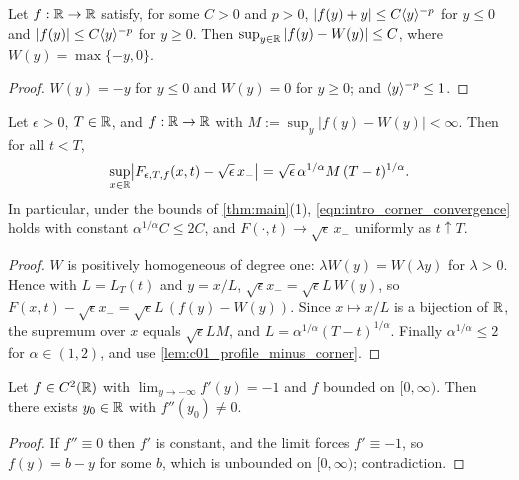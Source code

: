 \begin{lemma}
  \label{lem:c01_profile_minus_corner}
  Let $f:\mathbb{R}\to\mathbb{R}$ satisfy, for some $C>0$ and $p>0$, $|f(y)+y|\le C\langle y \rangle^{-p}$ for $y\le0$ and
  $|f(y)|\le C\langle y \rangle^{-p}$ for $y\ge0$.  Then $\sup_{y\in\mathbb{R}}|f(y)-W(y)|\le C$, where
  $W(y)=\max\{-y,0\}$.
\end{lemma}
\begin{proof}
  $W(y)=-y$ for $y\le0$ and $W(y)=0$ for $y\ge0$; and $\langle y \rangle^{-p}\le1$.
\end{proof}

\begin{lemma}
  \label{lem:c01_corner_convergence}
  Let $\epsilon>0$, $T\in\mathbb{R}$, and $f:\mathbb{R}\to\mathbb{R}$ with $M:=\sup_y|f(y)-W(y)|<\infty$.  Then for all
  $t<T$,
  \[
    \sup_{x\in\mathbb{R}}\bigl|F_{\epsilon,T,f}(x,t)-\sqrt\epsilon\,x_-\bigr|=\sqrt\epsilon\,\alpha^{1/\alpha}M\,(T-t)^{1/\alpha}.
  \]
  In particular, under the bounds of \cref{thm:main}(1), \eqref{eqn:intro_corner_convergence} holds
  with constant $\alpha^{1/\alpha}C\le 2C$, and $F(\cdot,t)\to\sqrt\epsilon\,x_-$ uniformly as $t\uparrow T$.
\end{lemma}
\begin{proof}
  $W$ is positively homogeneous of degree one: $\lambda W(y)=W(\lambda y)$ for $\lambda>0$.  Hence
  with $L=L_T(t)$ and $y=x/L$, $\sqrt\epsilon x_-=\sqrt\epsilon L\,W(y)$, so
  $F(x,t)-\sqrt\epsilon x_-=\sqrt\epsilon L\,(f(y)-W(y))$.  Since $x\mapsto x/L$ is a bijection of $\mathbb{R}$,
  the supremum over $x$ equals $\sqrt\epsilon L M$, and $L=\alpha^{1/\alpha}(T-t)^{1/\alpha}$.  Finally
  $\alpha^{1/\alpha}\le2$ for $\alpha\in(1,2)$, and use \cref{lem:c01_profile_minus_corner}.
\end{proof}

\begin{lemma}
  \label{lem:c01_profile_not_affine}
  Let $f\in C^2(\mathbb{R})$ with $\lim_{y\to-\infty}f'(y)=-1$ and $f$ bounded on $[0,\infty)$.  Then there
  exists $y_0\in\mathbb{R}$ with $f''(y_0)\ne0$.
\end{lemma}
\begin{proof}
  If $f''\equiv0$ then $f'$ is constant, and the limit forces $f'\equiv-1$, so $f(y)=b-y$ for
  some $b$, which is unbounded on $[0,\infty)$; contradiction.
\end{proof}

